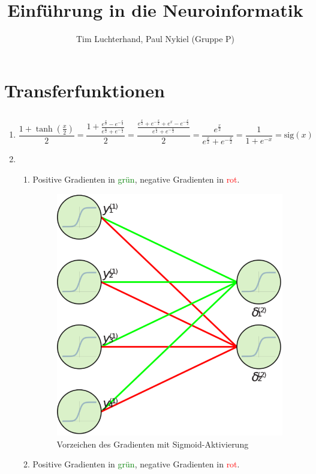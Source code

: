 \documentclass[DIN, pagenumber=false, fontsize=11pt, parskip=half]{scrartcl}
\title{Einführung in die Neuroinformatik}
\author{Tim Luchterhand, Paul Nykiel (Gruppe P)}
\begin{document}
    \maketitle
    \section{Transferfunktionen}
    \subsection{}
    \begin{enumerate}[label=\alph*)]
        \item 
            \begin{equation*}
                \frac{1+\tanh \left( \frac{x}{2} \right)}{2} 
                = \frac{1 + \frac{e^\frac{x}{2} - e^{-\frac{x}{2}}}{e^\frac{x}{2} + e^{-\frac{x}{2}}}}{2} 
                = \frac{\frac{e^\frac{x}{2} + e^{-\frac{x}{2}} + e^{x} - e^{-\frac{x}{2}}}{e^\frac{x}{2}+e^{-\frac{x}{2}}}}{2} 
                = \frac{e^{\frac{x}{2}}}{e^\frac{x}{2} + e^{-\frac{x}{2}}}
                = \frac{1}{1+e^{-x}} = \text{sig} (x)
            \end{equation*}
        \item $ $
            \begin{enumerate}[label=\roman*.]
                \item Positive Gradienten in \textcolor{green}{grün}, negative Gradienten in \textcolor{red}{rot}.
                    \begin{figure}[H]
                        \centering
                        \includegraphics[width=.5\textwidth]{sigmoid_grad.eps}
                        \caption{Vorzeichen des Gradienten mit Sigmoid-Aktivierung}
                    \end{figure}
                \item Positive Gradienten in \textcolor{green}{grün}, negative Gradienten in \textcolor{red}{rot}.

\end{enumerate}
\end{enumerate}
\end{document}

